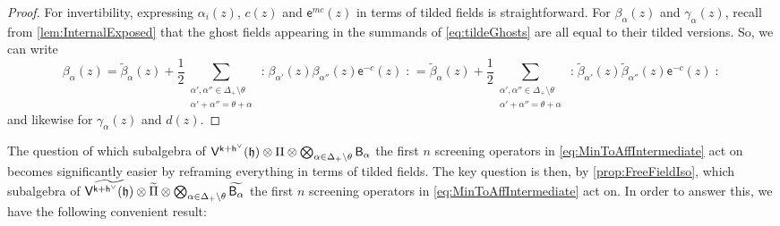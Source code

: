 \documentclass[10pt,a4paper]{amsart}
\numberwithin{equation}{section}
\newcommand{\ee}{\mathsf{e}}   %
\newcommand{\kk}{\mathsf{k}}   %
\DeclarePairedDelimiter{\brac}{\lparen}{\rparen}   %
\newcommand{\no}[1]{\mathopen{:} #1 \mathclose{:}} %
\newcommand{\VOA}[1]{\mathsf{#1}}    %
\newcommand{\cartan}{\mathfrak{h}}
\newcommand{\cox}{\mathsf{h}}                                        %
\newcommand{\dcox}{\coroot{\cox}}                                    %
\newcommand{\proots}{\Delta_+}                                       %
\newcommand{\sroot}[1]{\alpha_{#1}}                                  %
\newcommand{\hroot}{\theta}                                          %
\newcommand{\coroot}[1]{#1^{\vee}}                                   %
\newcommand{\uaffvoa}[2]{\VOA{V}^{#1}\brac{#2}}                   %
\newcommand{\bgvoa}{\VOA{B}}                                      %
\theoremstyle{plain}
\begin{document}
\begin{proof}
For invertibility, expressing $\sroot{i}(z)$, $c(z)$ and $\ee^{mc}(z)$ in terms of tilded fields is straightforward. For $\beta_\alpha(z)$ and $\gamma_\alpha(z)$, recall from \cref{lem:InternalExposed} that the ghost fields appearing in the summands of \eqref{eq:tildeGhosts} are all equal to their tilded versions. So, we can write
%
\begin{equation} \label{eq:untildedB}
    \beta_\alpha(z) = 
    \tilde{\beta}_\alpha(z) + \frac{1}{2}\sum_{\substack{\alpha',\alpha'' \in \proots \setminus \hroot \\ \alpha'+\alpha''=\hroot+\alpha}} \no{\beta_{\alpha'} (z) \beta_{\alpha''}(z)\ee^{-c}(z)} =
    \tilde{\beta}_\alpha(z) + \frac{1}{2}\sum_{\substack{\alpha',\alpha'' \in \proots \setminus \hroot \\ \alpha'+\alpha''=\hroot+\alpha}} \no{\tilde{\beta}_{\alpha'} (z) \tilde{\beta}_{\alpha''}(z)\ee^{-c}(z)}
\end{equation}
%
and likewise for $\gamma_\alpha(z)$ and $d(z)$.
\end{proof}

The question of which subalgebra of $\uaffvoa{\kk+\dcox}{\cartan} \otimes \Pi \otimes \bigotimes_{\alpha \in \proots \setminus \hroot} \bgvoa_\alpha$ the first $n$ screening operators in \eqref{eq:MinToAffIntermediate} act on becomes significantly easier by reframing everything in terms of tilded fields. The key question is then, by \cref{prop:FreeFieldIso}, which subalgebra of $\widetilde{\uaffvoa{\kk+\dcox}{\cartan}} \otimes \widetilde{\Pi} \otimes \bigotimes_{\alpha \in \proots \setminus \hroot} \widetilde{\bgvoa_\alpha}$ the first $n$ screening operators in \eqref{eq:MinToAffIntermediate} act on. In order to answer this, we have the following convenient result:
\end{document}
